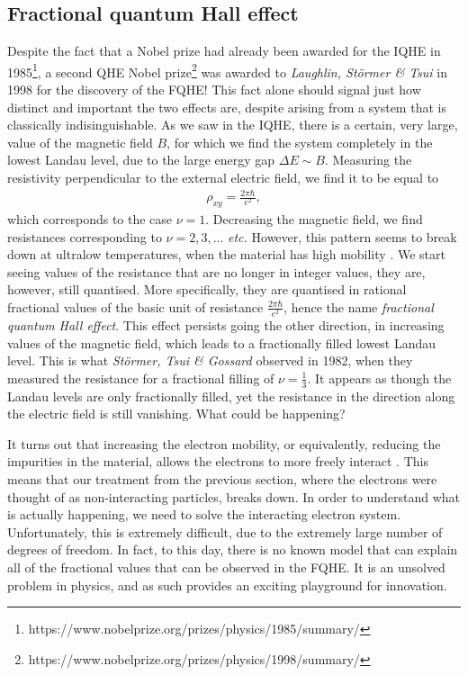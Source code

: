  \subsection{Fractional quantum Hall effect}

 Despite the fact that a Nobel prize had already been awarded for the IQHE in 1985\footnote[1]{https://www.nobelprize.org/prizes/physics/1985/summary/}, a second QHE Nobel prize\footnote[2]{https://www.nobelprize.org/prizes/physics/1998/summary/} was awarded to \textit{Laughlin, Störmer \& Tsui} \cite{Laughlin:1983fy, PhysRevLett.48.1559} in 1998 for the discovery of the FQHE! This fact alone should signal just how distinct and important the two effects are, despite arising from a system that is classically indisinguishable. As we saw in the IQHE, there is a certain, very large, value of the magnetic field $B$, for which we find the system completely in the lowest Landau level, due to the large energy gap $\Delta E \sim B$. Measuring the resistivity perpendicular to the external electric field, we find it to be equal to
\begin{align}
     \rho_{x y} = \frac{2\pi\hbar}{e^2},
\end{align}
  which corresponds to the case $\nu=1$. Decreasing the magnetic field, we find resistances corresponding to $\nu=2,3,...$ \textit{etc.} However, this pattern seems to break down at ultralow temperatures, when the material has high mobility \cite{yoshioka2002the}. We start seeing values of the resistance that are  no longer in integer values, they are, however, still quantised.  More specifically, they are quantised in rational fractional values of the basic unit of resistance $\frac{2 \pi\hbar}{e^2}$, hence the name \textit{fractional quantum Hall effect}. This effect persists going the other direction, in increasing values of the magnetic field, which leads to a fractionally filled lowest Landau level. This is what \textit{Störmer, Tsui \& Gossard} \cite{PhysRevLett.48.1559} observed in 1982, when they measured the resistance for a fractional filling of $\nu=\frac{1}{3}$. It appears as though the Landau levels are only fractionally filled, yet the resistance in the direction along the electric field is still vanishing. What could be happening?

 It turns out that increasing the electron mobility, or equivalently, reducing the impurities in the material, allows the electrons to more freely interact \cite{PhysRevB.37.8476}. This means that our treatment from the previous section, where the electrons were thought of as non-interacting particles, breaks down. In order to understand what is actually happening, we need to solve the interacting electron system. Unfortunately, this is extremely difficult, due to the extremely large number of degrees of freedom. In fact, to this day, there is no known model that can explain all of the fractional values that can be observed in the FQHE. It is an unsolved problem in physics, and as such provides an exciting playground for innovation.
 
